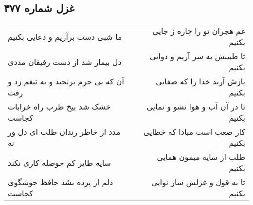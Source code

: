 \begin{center}
\section*{غزل شماره ۳۷۷}
\label{sec:sh377}
\begin{longtable}{l p{0.5cm} r}
ما شبی دست برآریم و دعایی بکنیم
&&
غم هجران تو را چاره ز جایی بکنیم
\\
دل بیمار شد از دست رفیقان مددی
&&
تا طبیبش به سر آریم و دوایی بکنیم
\\
آن که بی جرم برنجید و به تیغم زد و رفت
&&
بازش آرید خدا را که صفایی بکنیم
\\
خشک شد بیخ طرب راه خرابات کجاست
&&
تا در آن آب و هوا نشو و نمایی بکنیم
\\
مدد از خاطر رندان طلب ای دل ور نه
&&
کار صعب است مبادا که خطایی بکنیم
\\
سایه طایر کم حوصله کاری نکند
&&
طلب از سایه میمون همایی بکنیم
\\
دلم از پرده بشد حافظ خوشگوی کجاست
&&
تا به قول و غزلش ساز نوایی بکنیم
\\
\end{longtable}
\end{center}
